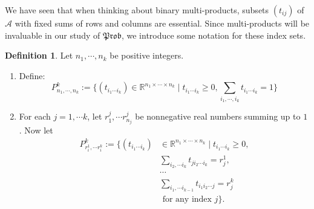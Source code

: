 \documentclass[a4paper]{amsproc}
\theoremstyle{plain}
\theoremstyle{definition}
\newtheorem{definition}[theorem]{Definition}
\theoremstyle{remark}
\numberwithin{equation}{section}
\newcommand{\Prob}{\mathfrak{Prob}}
\begin{document}
We have seen that when thinking about binary multi-products, subsets $(t_{ij})$ of $\mathcal{A}$ with fixed sums of rows and columns are essential. Since multi-products will be invaluable in our study of $\Prob$, we introduce some notation for these index sets.

\begin{definition}
    Let $n_1, \cdots, n_k$ be positive integers.
    \begin{enumerate}
        \item Define:
        \begin{equation*}
            P^k_{n_1,\cdots,n_k} := \{ (t_{i_1 \cdots i_k}) \in \mathbb{R}^{n_1 \times \cdots \times n_k} \mid t_{i_1 \cdots i_k} \geq 0, \sum_{i_1,\cdots,i_k} t_{i_1 \cdots i_k} = 1 \}
        \end{equation*}
        \item For each $j = 1, \cdots k$, let $r^j_1, \cdots r^j_{n_j}$ be nonnegative real numbers summing up to $1$. Now let
        \begin{equation*}
            \begin{split}
                P^k_{r_i^1,\cdots r_i^k} := \{ (t_{i_1 \cdots i_k}) &\in \mathbb{R}^{n_1 \times \cdots \times n_k} \mid t_{i_1 \cdots i_k} \geq 0, \\
                & \sum_{i_2,\cdots i_k} t_{j i_2 \cdots i_k} = r^1_j, \\
                & \cdots \\
                & \sum_{i_1,\cdots i_{k-1}} t_{i_1 i_2 \cdots j} = r^k_j \\
                & \text{ for any index } j \} .
            \end{split}
        \end{equation*}
    \end{enumerate}
\end{definition}
\end{document}
